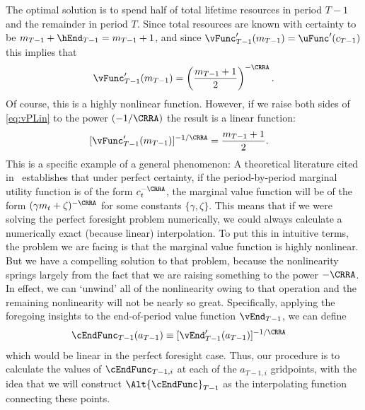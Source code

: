 \documentclass[titlepage, headings=optiontotocandhead]{\econtex}
\begin{document}
The optimal solution is to spend half of total lifetime resources in
period $T-1$ and the remainder in period $T$.  Since total resources
are known with certainty to be
${m}_{T-1}+\hEnd_{T-1}= {m}_{T-1}+1$, and since
${\vFunc}_{T-1}^{\prime}({m}_{T-1}) = \uFunc^{\prime}({c}_{T-1})$ this
implies that 
\begin{equation}
  \vFunc^{\prime}_{T-1}({m}_{T-1})  = \left(\frac{{m}_{T-1}+1}{2}\right)^{-\CRRA} \label{eq:vPLin}.
\end{equation}
Of course, this is a highly nonlinear
function.  However, if we raise both sides of \eqref{eq:vPLin} to the
power $(-1/\CRRA)$ the result is a linear function:
\begin{equation}\begin{gathered}\begin{aligned}
      [\vFunc^{\prime}_{T-1}({m}_{T-1})]^{-1/\CRRA}  & = \frac{{m}_{T-1}+1}{2}  .
    \end{aligned}\end{gathered}\end{equation}
This is a specific example of a general phenomenon: A theoretical
literature cited in~\cite{carroll&kimball:concavity} establishes that under
perfect certainty, if the period-by-period marginal utility function
is of the form ${c}_{t}^{-\CRRA}$, the marginal value function will be
of the form $(\gamma {m}_{t}+\zeta)^{-\CRRA}$ for some constants
$\{\gamma,\zeta\}$.  This means that if we were solving the perfect
foresight problem numerically, we could always calculate a numerically
exact (because linear) interpolation.  To put this in intuitive terms,
the problem we are facing is that the marginal value function is
highly nonlinear.  But we have a compelling solution to that problem,
because the nonlinearity springs largely from the fact that we are raising
something to the power $-\CRRA$.  In effect, we can `unwind' all of
the nonlinearity owing to that operation and the remaining
nonlinearity will not be nearly so great.  Specifically, applying the foregoing insights
to the end-of-period value function $\vEnd_{T-1}$, we can define
\begin{equation}\begin{gathered}\begin{aligned}
      \cEndFunc_{T-1}({a}_{T-1})  & \equiv  [\vEnd_{T-1}^{\prime}({a}_{T-1})]^{-1/\CRRA} \label{eq:cGoth}
    \end{aligned}\end{gathered}\end{equation}
which would be linear in the perfect foresight case.  Thus, our
procedure is to calculate the values of $\cEndFunc_{T-1,i}$ at each
of the ${a}_{T-1,i}$ gridpoints, with the idea that we will construct
$\Alt{\cEndFunc}_{T-1}$ as the interpolating function connecting
these
points.  %
\end{document}
